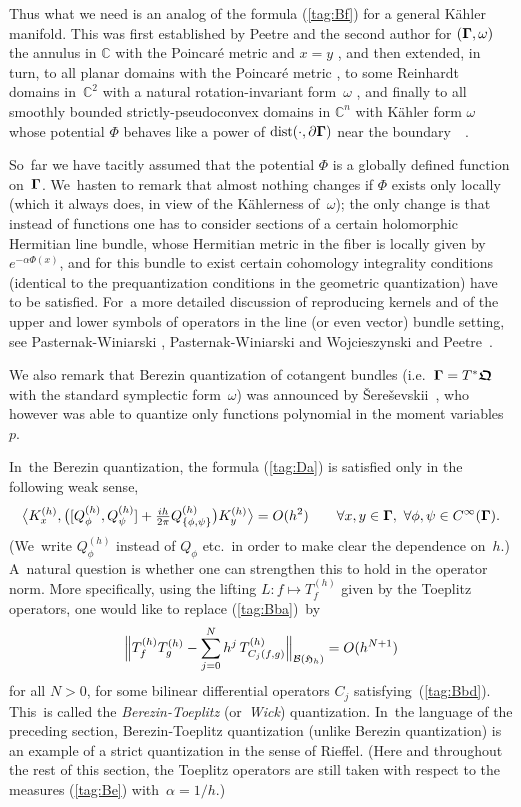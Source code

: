 \documentclass[11pt]{amsart}
\numberwithin{equation}{section}
\theoremstyle{remark}
\newcommand\h{^{(h)}}
\newcommand\Omg{{\bigam}}   %
\newcommand\HH{\mathfrak H}
\newcommand{\CC}{\C}
\newcommand{\bigam}{\mbox{\boldmath $\Gamma$}}
\newcommand{\bfrakQ}{\mbox{\boldmath $\mathfrak Q$}}
\newcommand{\C}{\mathbb C}
\begin{document}
Thus what we need is an analog of the formula (\ref{tag:Bf}) for a general
K\"ahler manifold. This was first established by Peetre and the second author
for $(\Omg,\omega)$ the annulus in $\CC$ with the Poincar\'e metric and $x=y$
\cite{bib:EP}, and then extended, in turn, to all planar domains with the
Poincar\'e metric \cite{bib:Duke}, to some Reinhardt domains in~$\CC^2$ with a
natural rotation-invariant form~$\omega$ \cite{bib:ET}, and finally to all
smoothly bounded strictly-pseudoconvex domains in $\CC^n$ with K\"ahler form
$\omega$ whose potential $\Phi$ behaves like a power of $\operatorname{dist}
(\cdot,\partial\Omg)$ near the boundary~\cite{bib:FR}~\cite{bib:ESI}.

So~far we have tacitly assumed that the potential $\Phi$ is a globally defined
function on~$\Omg$. We~hasten to remark that almost nothing changes if $\Phi$
exists only locally (which it always does, in view of the K\"ahlerness
of~$\omega$); the only change is that instead of functions one has to consider
sections of a certain holomorphic Hermitian line bundle, whose Hermitian
metric in the fiber is locally given by $e^{-\alpha\Phi(x)}$, and for this
bundle to exist certain cohomology integrality conditions (identical to the
prequantization conditions in the geometric quantization) have to be satisfied.
For~a more detailed discussion of reproducing kernels and of the upper and
lower symbols of operators in the line (or even vector) bundle setting, see
Pasternak-Winiarski \cite{bib:PWin}, Pasternak-Winiarski and Wojcieszynski
\cite{bib:PWinW} and Peetre~\cite{bib:Pee}.

We also remark that Berezin quantization of cotangent bundles (i.e.~$\Omg=T^*
\bfrakQ$ with the standard symplectic form~$\omega$) was announced by
\v{S}ere\v sevskii~\cite{bib:Sher}, who however was able to quantize only
functions polynomial in the moment variables~$p$.

In~the Berezin quantization, the formula (\ref{tag:Da}) is satisfied only in
the following weak sense,
$$ \big\langle K\h_x, \big( [Q\h_\phi,Q\h_\psi] + \tfrac{ih}{2\pi}
Q\h_{\{\phi,\psi\}} \big) K\h_y \big\rangle = O(h^2) \qquad
\forall x,y\in\Omg, \ \forall \phi,\psi\in C^\infty(\Omg).  $$
(We~write $Q\h_\phi$ instead of $Q_\phi$ etc.~in order to make clear the
dependence on~$h$.) A~natural question is whether one can strengthen this to
hold in the operator norm. More specifically, using the lifting $L:f\mapsto T\h
_f$ given by the Toeplitz operators, one would like to replace
(\ref{tag:Bba})~by
\begin{equation}  \Big\| T\h_f T\h_g - \sum_{j=0}^N h^j \,
T\h_{C_j(f,g)} \Big\|  _{\Cal B(\HH_h)} = O(h^{N+1})   \label{tag:Bg}
\end{equation}
for all $N>0$, for some bilinear differential operators $C_j$
satisfying~(\ref{tag:Bbd}). This~is called the {\sl Berezin-Toeplitz\/}
(or~{\sl Wick\/}) quantization. In~the language of the preceding section,
Berezin-Toeplitz quantization (unlike Berezin quantization) is an example of
a strict quantization in the sense of Rieffel. (Here and throughout the rest
of this section, the Toeplitz operators are still taken with respect to the
measures (\ref{tag:Be}) with~$\alpha=1/h$.)
\end{document}
